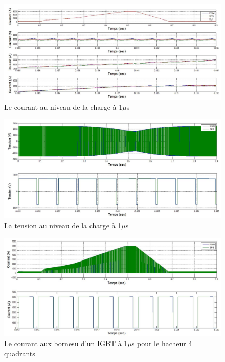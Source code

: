 \documentclass[11pt,letterpaper,final]{report}
\begin{document}
\begin{figure}[htb]
\centering
\includegraphics[scale=0.5]{Fig/Hach_AFE/1u/hach_cou_ch.jpg}
\caption{Le courant au niveau de la charge à 1$\mu$s}
\label{AF_HA_CHA1}
\end{figure}



\begin{figure}[htb]
\centering
\includegraphics[scale=0.5]{Fig/Hach_AFE/1u/hach_ten_ch.jpg}
\caption{La tension au niveau de la charge à 1$\mu$s}
\label{AF_HA_CHV1}
\end{figure}

\begin{figure}[htb]
\centering
\includegraphics[scale=0.5]{Fig/Hach_AFE/1u/IGBT_cou_hach.jpg}
\caption{Le courant aux bornesu d'un IGBT à 1$\mu$s pour le hacheur 4 quadrants}
\label{AF_HA_HAA1}
\end{figure}
\end{document}
